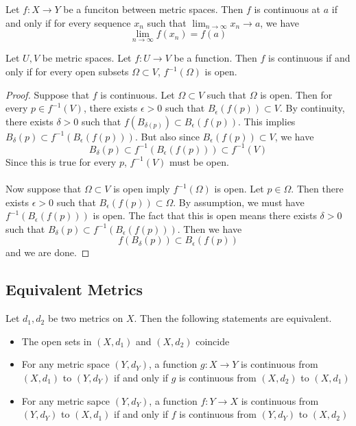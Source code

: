 \begin{prp}{}{} Let $f:X\to Y$ be a funciton between metric spaces. Then $f$ is continuous at $a$ if and only if for every sequence $x_n$ such that $\lim_{n\to\infty}x_n\to a$, we have $$\lim_{n\to\infty}f(x_n)=f(a)$$
\end{prp}

\begin{thm}{}{} Let $U,V$ be metric spaces. Let $f:U\to V$ be a function. Then $f$ is continuous if and only if for every open subsets $\Omega\subset V$, $f^{-1}(\Omega)$ is open. \tcbline
\begin{proof} Suppose that $f$ is continuous. Let $\Omega\subset V$ such that $\Omega$ is open. Then for every $p\in f^{-1}(V)$, there exists $\epsilon>0$ such that $B_{\epsilon}(f(p))\subset V$. By continuity, there exists $\delta>0$ such that $f(B_{\delta(p)})\subset B_{\epsilon}(f(p))$. This implies $B_{\delta}(p)\subset f^{-1}(B_{\epsilon}(f(p)))$. But also since $B_{\epsilon}(f(p))\subset V$, we have $$B_{\delta}(p)\subset f^{-1}(B_{\epsilon}(f(p)))\subset f^{-1}(V)$$ Since this is true for every $p$, $f^{-1}(V)$ must be open. \\~\\
Now suppose that $\Omega\subset V$ is open imply $f^{-1}(\Omega)$ is open. Let $p\in \Omega$. Then there exists $\epsilon>0$ such that $B_{\epsilon}(f(p))\subset\Omega$. By assumption, we must have $f^{-1}(B_{\epsilon}(f(p)))$ is open. The fact that this is open means there exists $\delta>0$ such that $B_{\delta}(p)\subset f^{-1}(B_{\epsilon}(f(p)))$. Then we have $$f(B_{\delta}(p))\subset B_{\epsilon}(f(p))$$
and we are done. 
\end{proof}
\end{thm}

\subsection{Equivalent Metrics}
\begin{thm}{}{} Let $d_1,d_2$ be two metrics on $X$. Then the following statements are equivalent. 
\begin{itemize}
\item The open sets in $(X,d_1)$ and $(X,d_2)$ coincide
\item For any metric space $(Y,d_Y)$, a function $g:X\to Y$ is continuous from $(X,d_1)$ to $(Y,d_Y)$ if and only if $g$ is continuous from $(X,d_2)$ to $(X,d_1)$
\item For any metric sapce $(Y,d_Y)$, a function $f:Y\to X$ is continuous from $(Y,d_Y)$ to $(X,d_1)$ if and only if $f$ is continuous from $(Y,d_Y)$ to $(X,d_2)$
\end{itemize}
\end{thm}

